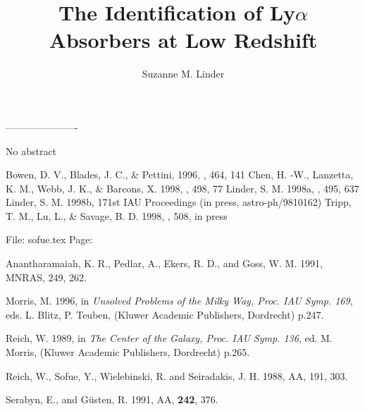 {{{{{{{{{{{{{{\begin{references}
\end{references}

----------------------

\setcounter{page}{507}
\title{The Identification of Ly$\alpha$ Absorbers at Low Redshift}
\author{Suzanne M. Linder}

No abstract

\begin{references}
 Bowen, D. V., Blades, J. C., \& Pettini, 1996, \apj, 464, 141
 Chen, H. -W., Lanzetta, K. M., Webb, J. K., \& Barcons, X. 1998,
\apj, 498, 77
 Linder, S. M. 1998a, \apj, 495, 637
 Linder, S. M. 1998b, 171st IAU Proceedings (in press,
astro-ph/9810162)
 Tripp, T. M., Lu, L., \& Savage, B. D. 1998, \apj, 508, in press
\end{references}

File: sofue.tex
Page:		 \setcounter{page}{514}
\begin{references}

  Anantharamaiah, K. R., Pedlar, A., Ekers, R. D., and
Goss, W. M. 1991, MNRAS, 249, 262.



 Morris, M. 1996, in {\it Unsolved Problems of the Milky Way,
Proc. IAU Symp. 169},
eds. L. Blitz, P. Teuben, (Kluwer Academic Publishers, Dordrecht) p.247.

 Reich, W. 1989, in {\it The Center of the Galaxy,
Proc. IAU Symp. 136},
ed. M. Morris, (Kluwer Academic Publishers, Dordrecht) p.265.

  Reich, W.,  Sofue, Y., Wielebinski, R. and Seiradakis, J. H.
1988, AA, 191, 303.

  Serabyn, E., and G\"usten, R. 1991, AA, {\bf 242}, 376.








\end{references}}}}}}}}}}}}}}}

